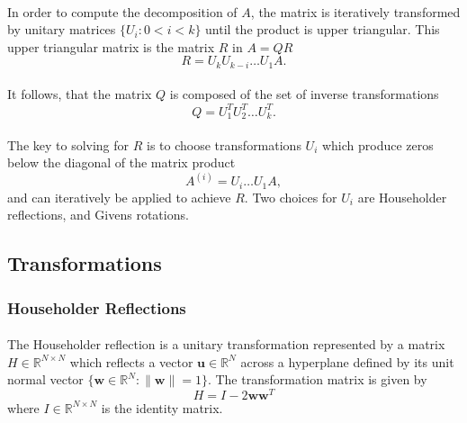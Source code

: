 \documentclass{article}
\begin{document}
\paragraph{}
In order to compute the decomposition of $A$, the matrix is iteratively transformed by unitary matrices $\{U_i : 0 < i < k\}$ until the product is upper triangular. This upper triangular matrix is the matrix $R$ in $A = QR$
\begin{equation}
	\label{eqn:r}
R = U_kU_{k-i} \dots U_1A.
\end{equation}
\paragraph{}
It follows, that the matrix $Q$ is composed of the set of inverse transformations
\begin{equation}
	\label{eqn:q}
Q = U_{1}^{T}U_{2}^{T} \dots U_{k}^{T}.
\end{equation}
\paragraph{}
The key to solving for $R$ is to choose transformations $U_i$ which produce zeros below the diagonal of the matrix product
\begin{equation}
	\label{eqn:update}
A^{(i)} = U_{i} \dots U_1A,
\end{equation}
and can iteratively be applied to achieve $R$. Two choices for $U_i$ are Householder reflections, and Givens rotations.

\subsection{Transformations}
\subsubsection{Householder Reflections}
\paragraph{}
The Householder reflection is a unitary transformation represented by a matrix $H\in\mathbb{R}^{N\times{}N}$ which reflects a vector $\mathbf{u}\in\mathbb{R}^N$ across a hyperplane defined by its unit normal vector $\{\mathbf{w}\in\mathbb{R}^N: \|\mathbf{w}\|=1\}$. The transformation matrix is given by
\begin{equation}
	\label{eqn:Householder}
H = I - 2\mathbf{ww}^T
\end{equation}
where $I\in\mathbb{R}^{N\times{}N}$ is the identity matrix. \cite{bhaskar86householder} \cite{lambers21}
\end{document}
